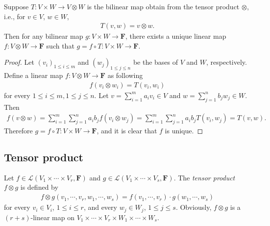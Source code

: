\begin{theorem}
    Suppose $T : V \times W \to V \otimes W$ is the bilinear map obtain from the tensor product $\otimes$, i.e., for $v \in V$, $w \in W$,
    \begin{align*}
        T(v, w) = v \otimes w.
    \end{align*}
    Then for any bilinear map $g : V \times W \to \mathbf{F}$, there exists a unique linear map $f : V \otimes W \to \mathbf{F}$ such that $g = f \circ T : V \times W \to \mathbf{F}$.
\end{theorem}

\begin{proof}
    Let $(v_i)_{1 \leq i \leq m}$ and $(w_j)_{1 \leq j \leq n}$ be the bases of $V$ and $W$, respectively. Define a linear map $f : V \otimes W \to \mathbf{F}$ as following
    \begin{align*}
        f(v_i \otimes w_i) = T(v_i, w_i)
    \end{align*}
    for every $1 \leq i \leq m, 1 \leq j \leq n$. Let $v = \sum_{i = 1}^{m}a_iv_i \in V$ and $w = \sum_{j = 1}^{n}b_jw_j \in W$. Then
    \begin{align*}
        f(v \otimes w)
        = \sum_{i = 1}^{m}\sum_{j = 1}^{n}a_ib_jf(v_i \otimes w_j)
        = \sum_{i = 1}^{m}\sum_{j = 1}^{n}a_ib_jT(v_i, w_j)
        = T(v, w).
    \end{align*}
    Therefore $g = f \circ T : V \times W \to \mathbf{F}$, and it is clear that $f$ is unique.
\end{proof}

\subsection{Tensor product}

\begin{definition}
    Let $f \in \mathcal{L}(V_1 \times \cdots \times V_r, \mathbf{F})$ and $g \in \mathcal{L}(V_1 \times \cdots \times V_s, \mathbf{F})$. The \emph{tensor product} $f \otimes g$ is defined by
    \begin{align*}
        f \otimes g(v_1, \cdots, v_r, w_1, \cdots, w_s) = f(v_1, \cdots, v_r) \cdot g(w_1, \cdots, w_s)
    \end{align*}
    for every $v_i \in V_i$, $1 \leq i \leq r$, and every $w_j \in W_j$, $1 \leq j \leq s$. Obviously, $f \otimes g$ is a $(r + s)$-linear map on $V_1 \times \cdots \times V_r \times W_1 \times \cdots \times W_s$.
\end{definition}

